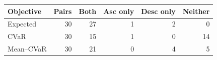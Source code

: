 \begin{tabular}{lrrrrr}
\toprule
Objective & Pairs & Both & Asc only & Desc only & Neither \\
\midrule
Expected & 30 & 27 & 1 & 2 & 0 \\
CVaR & 30 & 15 & 1 & 0 & 14 \\
Mean--CVaR & 30 & 21 & 0 & 4 & 5 \\
\bottomrule
\end{tabular}
